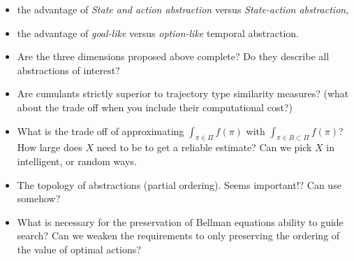 \begin{itemize}
  \tightlist
  \item the advantage of \textit{State and action abstraction} versus \textit{State-action abstraction},
  \item the advantage of \textit{goal-like} versus \textit{option-like} temporal abstraction.
  \item Are the three dimensions proposed above complete? Do they describe all abstractions of interest?
  \item Are cumulants strictly superior to trajectory type similarity measures? (what about the trade off when you include their computational cost?)
  \item What is the trade off of approximating $\int_{\pi \in \Pi}f(\pi)$ with $\int_{\pi \in B \subset \Pi}f(\pi)$?
  How large does $X$ need to be to get a reliable estimate? Can we pick $X$ in intelligent, or random ways.
  \item The topology of abstractions (partial ordering). Seems important!? Can use somehow?
  \item What is necessary for the preservation of Bellman equations ability to guide search? Can we weaken the requirements to only preserving the ordering of the value of optimal actions?
\end{itemize}

